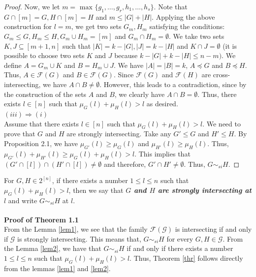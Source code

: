 \documentclass[reqno,english]{amsart}
\theoremstyle{plain}
\theoremstyle{remark}
\newcommand{\0}[0]{\emptyset}
\renewcommand{\1}[0]{\textbf{1}}
\theoremstyle{plain}
\theoremstyle{remark}
\renewcommand{\1}[0]{\textbf{1}}
\begin{document}
\begin{proof}
Now, we let $m = \text{ max } \{g_{1},\ldots,g_{r}, h_{1},\ldots,h_{s}\}$. Note that $G \cap [m] =G, H \cap [m]=H$ and $m \leq |G|+|H|$. Applying the above construction for $l=m$, we get two sets $G_{m}, H_{m}$ satisfying the conditions: $G_{m} \leq G, H_{m} \leq H, G_{m} \cup H_{m}=[m]$ and $G_{m} \cap H_{m}=\emptyset$. We take two sets $K,J \subseteq[m+1,n]$ such that $|K|=k-|G|, |J|=k-|H|$ and $K \cap J=\emptyset$ (it is possible to choose two sets $K$ and $J$ because $k-|G|+k-|H| \leq n-m )$. We define $A=G_{m} \cup K$ and $B=H_{m} \cup J$. We have $|A|=|B|=k$, $A \preceq G$ and $B \preceq H$. Thus, $A \in \mathcal{F}(G)$ and $B \in \mathcal{F}(G)$. Since $\mathcal{F}(G)$ and $\mathcal{F}(H)$ are cross-intersecting, we have $A \cap B \neq \emptyset$.
However, this leads to a contradiction, since by the construction of the sets $A$ and $B$, we clearly have $A \cap B =\emptyset$. Thus, there exists $l \in [n]$ such that $\mu_{G}(l)+\mu_{H}(l) > l$ as desired.\\
$(iii) \Rightarrow (i)$\\
Assume that there exists $l \in [n]$ such that $\mu_{G}(l) +\mu_{H}(l) > l$. We need to prove that $G$ and $H$ are strongly intersecting. Take any $G' \leq G$ and $H' \leq H$. By Proposition 2.1, we have $\mu_{G'}(l) \geq \mu_{G}(l)$ and $\mu_{H'}(l) \geq \mu_{H}(l)$. Thus, $\mu_{G'}(l) +\mu_{H'}(l) \geq \mu_{G}(l) +\mu_{H}(l) > l$. This implies that $(G' \cap [l])\cap (H' \cap [l]) \neq \emptyset$ and therefore, $G' \cap H' \neq \emptyset$. Thus, $G \sim_{si} H$. 
\end{proof}
For $G,H \in 2^{[n]}$, if there exists a number $1 \leq l \leq n$ such that 
$\mu_{G}(l)+\mu_{H}(l) > l$, then we say that {\bf \emph{ $G$ and $H$ are strongly intersecting at $l$ }} and write $G \sim_{si} H$ at $l$.\\ \\
\textbf{ Proof of Theorem 1.1}\\
From the Lemma \ref{lem1}, we see that the family $\mathcal{F}(\mathcal{G})$ is intersecting if and only if $\mathcal{G}$ is strongly intersecting. This means that, $G \sim_{si} H$ for every $G,H \in \mathcal{G}$. From the Lemma \ref{lem2}, we have that $G \sim_{si} H$ if anđ only if there exists a number $1 \leq l \leq n$ such that 
$\mu_{G}(l)+\mu_{H}(l) > l$. Thus, Theorem \ref{thr} follows directly from the lemmas \ref{lem1} and \ref{lem2}.
\end{document}
